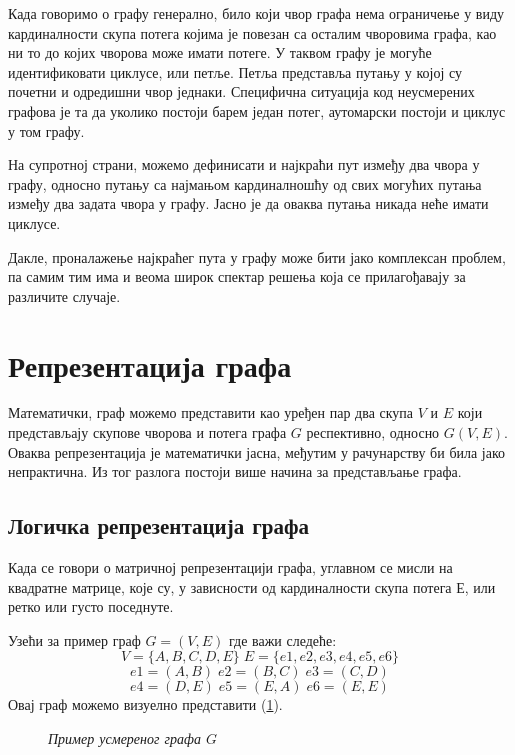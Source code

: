 \par
Када говоримо о графу генерално, било који чвор графа нема ограничење у виду кардиналности скупа потега којима је повезан са осталим чворовима графа, као ни то до којих чворова може имати потеге. У таквом графу је могуће идентификовати циклусе, или петље. Петља представља путању у којој су почетни и одредишни чвор једнаки. Специфична ситуација код неусмерених графова је та да уколико постоји барем један потег, аутомарски постоји и циклус у том графу.

\par
На супротној страни, можемо дефинисати и најкраћи пут између два чвора у графу, односно путању са најмањом кардиналношћу од свих могућих путања између два задата чвора у графу. Јасно је да оваква путања никада неће имати циклусе.

\par
Дакле, проналажење најкраћег пута у графу може бити јако комплексан проблем, па самим тим има и веома широк спектар решења која се прилагођавају за различите случаје. 

\section{Репрезентација графа}

\par
Математички, граф можемо представити као уређен пар два скупа $V$ и $E$ који представљају скупове чворова и потега графа $G$ респективно, односно $G(V, E)$. Оваква репрезентација је математички јасна, међутим у рачунарству би била јако непрактична. Из тог разлога постоји више начина за представљање графа.

\subsection{Логичка репрезентација графа}
Када се говори о матричној репрезентацији графа, углавном се мисли на квадратне матрице, које су, у зависности од кардиналности скупа потега $Е$, или ретко или густо поседнуте.

\par
Узећи за пример граф $G = (V, E)$ где важи следеће:
$$ V = \{A, B, C, D, E\} \; E = \{e1, e2, e3, e4, e5, e6\} $$
$$ e1 = (A, B) \; e2 = (B, C) \; e3 = (C, D) $$
$$ e4 = (D, E) \; e5 = (E, A) \; e6 = (E, E) $$
Овај граф можемо визуелно представити (\ref{fig:directed-graph}).
\begin{figure}[!ht]
    \centering
    \caption{\textit{Пример усмереног графа $G$}}
    \label{fig:directed-graph}
\end{figure}

